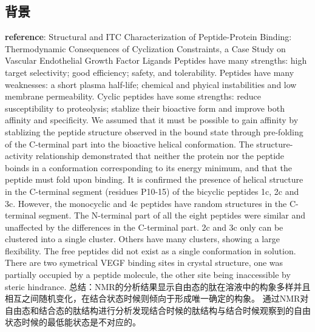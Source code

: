 \subsection{背景}
\noindent \textbf{reference}: Structural and ITC Characterization of Peptide-Protein Binding: Thermodynamic Consequences of Cyclization Constraints, a Case Study on Vascular Endothelial Growth Factor Ligands
\newline \indent Peptides have many strengths: high target selectivity; good efficiency; safety, and tolerability.
\newline \indent Peptides have many weaknesses: a short plasma half-life; chemical and phyical instabilities and low membrane permeability.
\newline \indent Cyclic peptides have some strengths: reduce susceptibility to proteolysis; stablize their bioactive form and improve both affinity and specificity.
\newline \indent We assumed that it must be possible to gain affinity by stablizing the peptide structure observed in the bound state through pre-folding of the C-terminal part into the bioactive helical conformation.
\newline \indent The structure-activity relationship demonstrated that neither the protein nor the peptide boinds in a conformation corresponding to its energy minimum, and that the peptide must fold upon binding. 
\newline \indent It is confirmed the presence of helical structure in the C-terminal segment (residues P10-15) of the bicyclic peptides 1c, 2c and 3c. However, the monocyclic and 4c peptides have random structures in the C-terminal segment.
\newline \indent The N-terminal part of all the eight peptides were similar and unaffected by the differences in the C-terminal part.
\newline \indent 2c and 3c only can be clustered into a single cluster. Others have many clusters, showing a large flexibility.
\newline \indent The free peptides did not exist as a single conformation in solution.
\newline \indent There are two symetrical VEGF binding sites in crystal structure, one was partially occupied by a peptide molecule, the other site being inaccessible by steric hindrance.
\newline \indent 总结：NMR的分析结果显示自由态的肽在溶液中的构象多样并且相互之间随机变化，在结合状态时候则倾向于形成唯一确定的构象。
通过NMR对自由态和结合态的肽结构进行分析发现结合时候的肽结构与结合时候观察到的自由状态时候的最低能状态是不对应的。
